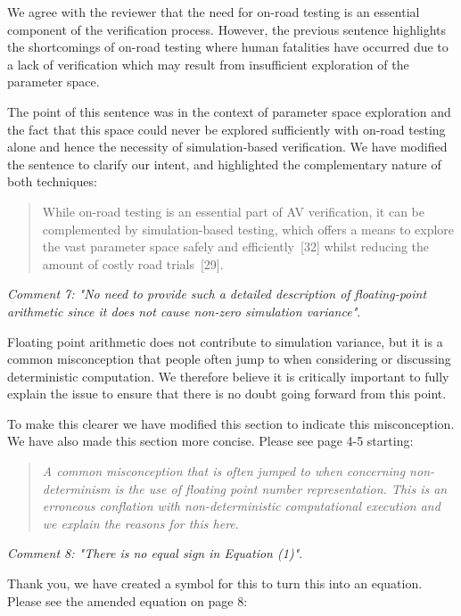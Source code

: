 \documentclass[11pt, a4paper]{letter} %
\begin{document}
\begin{letter}
We agree with the reviewer that the need for on-road testing is an essential component of the verification process. However, the previous sentence highlights the shortcomings of on-road testing where human fatalities have occurred due to a lack of verification which may result from insufficient exploration of the parameter space.

The point of this sentence  was in the context of parameter space exploration and the fact that this space could never be explored sufficiently with on-road testing alone and hence the necessity of simulation-based verification. We have modified the sentence to clarify our intent, and highlighted the complementary nature of both techniques:
\begin{quote}
While on-road testing is an essential part of AV verification, it can be complemented by simulation-based testing, which offers a means to explore the vast parameter space safely and efficiently~[32] whilst reducing the amount of costly road trials~[29].
\end{quote}

\bigskip

\textit{Comment 7: "No need to provide such a detailed description of floating-point arithmetic since it does not cause non-zero simulation variance"}.

Floating point arithmetic does not contribute to simulation variance, but it is a common misconception that people often jump to when considering or discussing deterministic computation. We therefore believe it is critically important to fully explain the issue to ensure that there is no doubt going forward from this point.

To make this clearer we have modified this section to indicate this misconception. We have also made this section more concise. Please see page 4-5 starting:
\begin{quote}
\textit{A common misconception that is often jumped to when concerning non-determinism is the use of floating point number representation. This is an erroneous conflation with non-deterministic computational execution and we explain the reasons for this here}.
\end{quote}

\bigskip

\textit{Comment 8: "There is no equal sign in Equation (1)"}.

Thank you, we have created a symbol for this to turn this into an equation. Please see the amended equation on page 8:


\end{letter}
\end{document}
